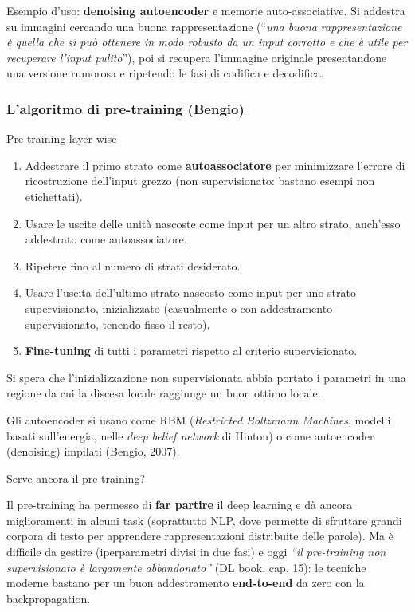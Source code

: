 Esempio d'uso: \textbf{denoising autoencoder} e memorie
auto-associative. Si addestra su immagini cercando una buona
rappresentazione (``\emph{una buona rappresentazione è quella che si può
ottenere in modo robusto da un input corrotto e che è utile per
recuperare l'input pulito}''), poi si recupera l'immagine originale
presentandone una versione rumorosa e ripetendo le fasi di codifica e
decodifica.

\subsubsection{L'algoritmo di pre-training
(Bengio)}\label{lalgoritmo-di-pre-training-bengio}

\begin{boxabstract}{Pre-training layer-wise}

\begin{enumerate}
\def\labelenumi{\arabic{enumi}.}
\tightlist
\item
  Addestrare il primo strato come \textbf{autoassociatore} per
  minimizzare l'errore di ricostruzione dell'input grezzo (non
  supervisionato: bastano esempi non etichettati).
\item
  Usare le uscite delle unità nascoste come input per un altro strato,
  anch'esso addestrato come autoassociatore.
\item
  Ripetere fino al numero di strati desiderato.
\item
  Usare l'uscita dell'ultimo strato nascosto come input per uno strato
  supervisionato, inizializzato (casualmente o con addestramento
  supervisionato, tenendo fisso il resto).
\item
  \textbf{Fine-tuning} di tutti i parametri rispetto al criterio
  supervisionato.
\end{enumerate}

Si spera che l'inizializzazione non supervisionata abbia portato i
parametri in una regione da cui la discesa locale raggiunge un buon
ottimo locale.

\end{boxabstract}

Gli autoencoder si usano come RBM (\emph{Restricted Boltzmann Machines},
modelli basati sull'energia, nelle \emph{deep belief network} di Hinton)
o come autoencoder (denoising) impilati (Bengio, 2007).

\begin{boxnote}{Serve ancora il pre-training?}

Il pre-training ha permesso di \textbf{far partire} il deep learning e
dà ancora miglioramenti in alcuni task (soprattutto NLP, dove permette
di sfruttare grandi corpora di testo per apprendere rappresentazioni
distribuite delle parole). Ma è difficile da gestire (iperparametri
divisi in due fasi) e oggi \emph{``il pre-training non supervisionato è
largamente abbandonato''} (DL book, cap. 15): le tecniche moderne
bastano per un buon addestramento \textbf{end-to-end} da zero con la
backpropagation.

\end{boxnote}

